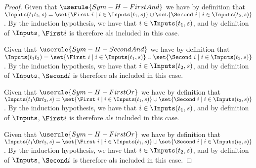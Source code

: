 \begin{proof}
       {Given that $\userule{Sym-H-FirstAnd}$ we have by definition that $\Inputs(t_1\And t_2,s) = \set{\First\ i \mid i \in \Inputs(t_1,s)} \cup \set{\Second\ i \mid i \in \Inputs(t_2,s)}$.
       By the induction hypothesis, we have that $i\in\Inputs(t_1,s)$, and by definition of $\Inputs$, $\First i$ is therefore als included in this case.}

       {Given that $\userule{Sym-H-SecondAnd}$ we have by definition that $\Inputs(t_1\And t_2) = \set{\First\ i \mid i \in \Inputs(t_1,s)} \cup \set{\Second\ i \mid i \in \Inputs(t_2,s)}$.
       By the induction hypothesis, we have that $i\in\Inputs(t_2,s)$, and by definition of $\Inputs$, $\Second i$ is therefore als included in this case.}

       {Given that $\userule{Sym-H-FirstOr}$ we have by definition that $\Inputs(t_1\Or t_2,s) = \set{\First\ i \mid i \in \Inputs(t_1,s)} \cup \set{\Second\ i \mid i \in \Inputs(t_2,s)}$.
       By the induction hypothesis, we have that $i\in\Inputs(t_1,s)$, and by definition of $\Inputs$, $\First i$ is therefore als included in this case.}

       {Given that $\userule{Sym-H-FirstOr}$ we have by definition that $\Inputs(t_1\Or t_2,s) = \set{\First\ i \mid i \in \Inputs(t_1,s)} \cup \set{\Second\ i \mid i \in \Inputs(t_2,s)}$.
       By the induction hypothesis, we have that $i\in\Inputs(t_2,s)$, and by definition of $\Inputs$, $\Second i$ is therefore als included in this case.}
\end{proof}

